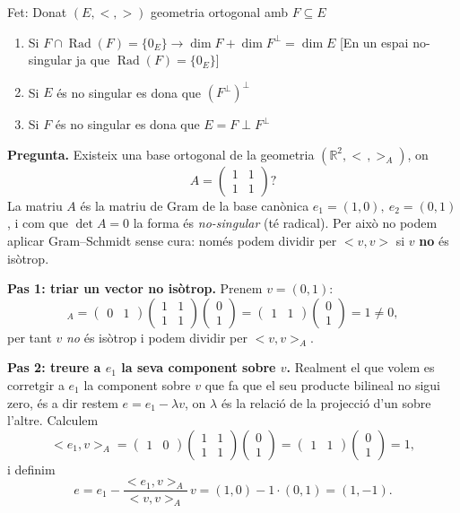 \documentclass[12pt]{article}
\newcommand{\R}{\mathbb{R}}
\begin{document}
\noindent Fet: Donat $(E, <,>)$ geometria ortogonal amb $F \subseteq E$

\begin{enumerate}
    \item Si $F \cap \operatorname{Rad}(F) = \{0_E\} \rightarrow \dim F + \dim F^{\perp} = \dim E$ [En un espai no-singular ja que $\operatorname{Rad}(F) = \{0_E\}$]
    \item Si $E$ és no singular es dona que $(F^{\perp})^{\perp}$
    \item Si $F$ és no singular es dona que $E = F\perp F^{\perp}$
\end{enumerate}

\begin{examplebox}{}
    \textbf{Pregunta.} Existeix una base ortogonal de la geometria $(\R^2,<\,,>_A)$, on
    \[A=\begin{pmatrix}1&1\\1&1\end{pmatrix}?\]
    La matriu $A$ és la matriu de Gram de la base canònica $e_1=(1,0),\ e_2=(0,1)$, i com que $\det A=0$ la forma és \emph{no-singular} (té radical). Per això no podem aplicar Gram--Schmidt sense cura: només podem dividir per $< v,v>$ si $v$ \textbf{no} és isòtrop.

    \textbf{Pas 1: triar un vector no isòtrop.} Prenem $v=(0,1)$:
    \[< v,v>_A=\begin{pmatrix}0&1\end{pmatrix}\begin{pmatrix}1&1\\1&1\end{pmatrix}\begin{pmatrix}0\\1\end{pmatrix}=\begin{pmatrix}1&1\end{pmatrix}\begin{pmatrix}0\\1\end{pmatrix}=1\neq 0,\]
    per tant $v$ \emph{no} és isòtrop i podem dividir per $< v,v>_A$.

    \textbf{Pas 2: treure a $e_1$ la seva component sobre $v$.} Realment el que volem es corretgir a $e_1$ la component sobre $v$ que fa que el seu producte bilineal no sigui zero, és a dir restem $e = e_1 - \lambda v$, on $\lambda$ és la relació de la projecció d'un sobre l'altre. Calculem 
    \[< e_1,v>_A=\begin{pmatrix}1&0\end{pmatrix}\begin{pmatrix}1&1\\1&1\end{pmatrix}\begin{pmatrix}0\\1\end{pmatrix}=\begin{pmatrix}1&1\end{pmatrix}\begin{pmatrix}0\\1\end{pmatrix}=1,\]
    i definim
    \[e=e_1-\frac{< e_1,v>_A}{< v,v>_A}\,v=(1,0)-1\cdot(0,1)=(1,-1).\]


\end{examplebox}
\end{document}
